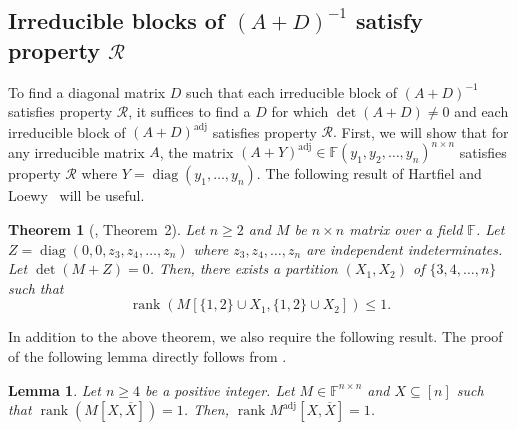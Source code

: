 \documentclass[11pt,letterpaper]{article}
\DeclareMathOperator*{\diag}{diag}
\DeclareMathOperator*{\rank}{rank}
\newcommand{\comp}[1]{\overline{#1}}
\newtheorem{theorem}{Theorem}[section]
\newtheorem{lemma}{Lemma}[section]
\DeclareMathOperator{\ad}{adj}
\newcommand{\adj}[1]{(#1)^{\ad}}
\newcommand{\PME}{\stackrel{\mathclap{\scalebox{.4}{\mbox{PME}}}}{=}}
\newcommand{\prop}{\mathcal{R}}
\begin{document}
{{{

\subsection{Irreducible blocks of \texorpdfstring{$(A+D)^{-1}$}{(A+D)\^(-1)} satisfy property $\prop$}

To find a diagonal matrix $D$ such that each irreducible block of $(A+D)^{-1}$ satisfies property $\prop$, it suffices to find a $D$ for which $\det(A+D) \neq 0$ and each irreducible block of $\adj{A+D}$ satisfies property $\prop.$
First, we will show that for any irreducible matrix $A$, the matrix $\adj{A+Y}\in \mathbb{F}(y_1,y_2,\dots,y_n)^{n \times n}$ satisfies property $\prop$ where $Y = \diag(y_1, \ldots, y_n)$. The following result of Hartfiel and Loewy~\cite[Theorem~2]{Hartfiell84} will be useful.
\begin{theorem}[\cite{Hartfiell84}, Theorem~2]
\label{lem:Qpropertyhelpertheorm}
    Let $n\geq 2$ and $M$ be $n\times n$ matrix over a field $\mathbb{F}$. Let $Z=\diag(0,0,z_3,z_4,\dots,z_n)$ where $z_3, z_4, \ldots, z_n$ are independent indeterminates. Let $\det(M+Z)=0$. Then, there exists a partition $(X_1, X_2)$ of $\{3,4,\dots,n\}$ such that $$\rank(M[\{1,2\}\cup X_1, \{1,2\}\cup X_2])\leq 1.$$ 
\end{theorem}


In addition to the above theorem, we also require the following result. The proof of the following lemma directly follows from \cite[Claim A.1]{Chatterjee25-full-version}.%
\begin{lemma}
\label{lem:AandAdjArank1}
Let $n\geq 4$ be a positive integer. Let $M\in \mathbb{F}^{n\times n}$ and $X\subseteq [n]$ such that $\rank( M[X,\comp{X}])=1$. Then, $\rank M^{\ad}[X,\comp{X}]=1$.
\end{lemma}

}}}
\end{document}
